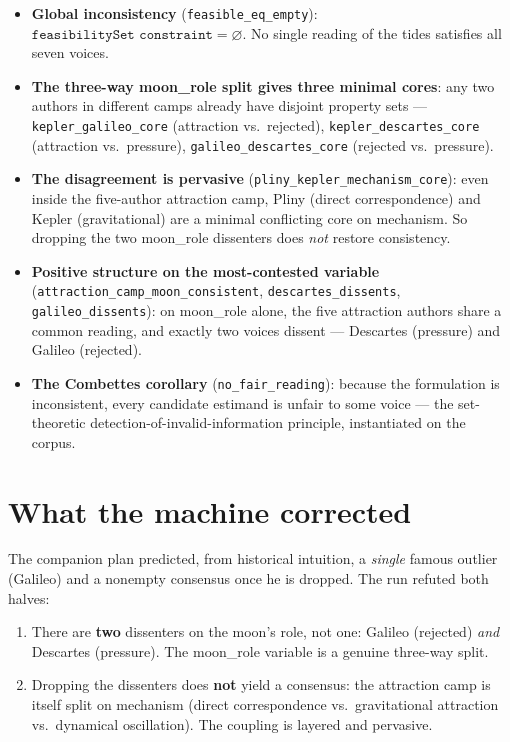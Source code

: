 \documentclass[11pt]{article}
\newcommand{\lean}[1]{\texttt{#1}}
\newcommand{\vv}[1]{\textsf{\small #1}}
\begin{document}
\begin{itemize}
\item \textbf{Global inconsistency} (\lean{feasible\_eq\_empty}):
  $\lean{feasibilitySet constraint} = \varnothing$. No single reading of
  the tides satisfies all seven voices.
\item \textbf{The three-way \vv{moon\_role} split gives three minimal
  cores}: any two authors in different camps already have disjoint
  property sets ---
  \lean{kepler\_galileo\_core} (attraction vs.\ rejected),
  \lean{kepler\_descartes\_core} (attraction vs.\ pressure),
  \lean{galileo\_descartes\_core} (rejected vs.\ pressure).
\item \textbf{The disagreement is pervasive}
  (\lean{pliny\_kepler\_mechanism\_core}): even inside the five-author
  attraction camp, Pliny (direct correspondence) and Kepler
  (gravitational) are a minimal conflicting core on \vv{mechanism}. So
  dropping the two \vv{moon\_role} dissenters does \emph{not} restore
  consistency.
\item \textbf{Positive structure on the most-contested variable}
  (\lean{attraction\_camp\_moon\_consistent},
  \lean{descartes\_dissents}, \lean{galileo\_dissents}): on
  \vv{moon\_role} alone, the five attraction authors share a common
  reading, and exactly two voices dissent --- Descartes (pressure) and
  Galileo (rejected).
\item \textbf{The Combettes corollary} (\lean{no\_fair\_reading}): because
  the formulation is inconsistent, every candidate estimand is unfair to
  some voice --- the set-theoretic detection-of-invalid-information
  principle, instantiated on the corpus.
\end{itemize}

\section{What the machine corrected}

The companion plan predicted, from historical intuition, a \emph{single}
famous outlier (Galileo) and a nonempty consensus once he is dropped. The
run refuted both halves:

\begin{enumerate}
\item There are \textbf{two} dissenters on the moon's role, not one:
  Galileo (rejected) \emph{and} Descartes (pressure). The
  \vv{moon\_role} variable is a genuine three-way split.
\item Dropping the dissenters does \textbf{not} yield a consensus: the
  attraction camp is itself split on \vv{mechanism} (direct
  correspondence vs.\ gravitational attraction vs.\ dynamical
  oscillation). The coupling is layered and pervasive.
\end{enumerate}
\end{document}
